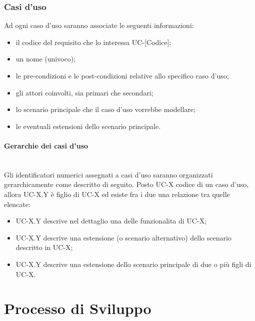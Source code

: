 \documentclass[11pt,a4paper]{article}
\begin{document}
\subsubsection{Casi d'uso}
Ad ogni caso d'uso saranno associate le seguenti informazioni:
\begin{itemize}
\item il codice del requisito che lo interessa UC-[Codice];
\item un nome (univoco);
\item le pre-condizioni e le post-condizioni relative allo specifico caso d'uso;
\item gli attori coinvolti, sia primari che secondari;
\item lo scenario principale che il caso d'uso vorrebbe modellare;
\item le eventuali estensioni dello scenario principale.
\end{itemize}

\paragraph{Gerarchie dei casi d'uso} 
\noindent \\
 Gli identificatori numerici assegnati a casi d'uso saranno organizzati gerarchicamente come descritto di seguito. Posto UC-X codice di un caso d'uso, allora UC-X.Y è figlio di UC-X ed esiste fra i due una relazione tra quelle elencate:
\begin{itemize}
\item UC-X.Y descrive nel dettaglio una delle funzionalita di UC-X;
\item UC-X.Y descrive una estensione (o scenario alternativo) dello scenario descritto in UC-X; 
\item UC-X.Y descrive una estensione dello scenario principale di due o più figli di UC-X.
\end{itemize}
\newpage
	
	\section{Processo di Sviluppo}
\end{document}
